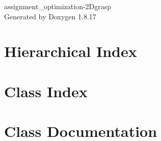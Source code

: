 \let\mypdfximage\pdfximage\def\pdfximage{\immediate\mypdfximage}\documentclass[twoside]{book}
\newcommand{\+}{\discretionary{\mbox{\scriptsize$\hookleftarrow$}}{}{}}
\newcommand{\clearemptydoublepage}{%
  \newpage{\pagestyle{empty}\cleardoublepage}%
}
\begin{document}
\hypersetup{pageanchor=false,
             bookmarksnumbered=true,
             pdfencoding=unicode
            }
\begin{titlepage}
\vspace*{7cm}
\begin{center}%
{\Large assignment\+\_\+optimization-\/2\+Dgrasp }\\
\vspace*{1cm}
{\large Generated by Doxygen 1.8.17}\\
\end{center}
\end{titlepage}
\clearemptydoublepage
{}
\tableofcontents
\clearemptydoublepage
{}
\hypersetup{pageanchor=true}

\chapter{Hierarchical Index}

\chapter{Class Index}

\chapter{Class Documentation}





\backmatter
\newpage
{}
\clearemptydoublepage
{}
\printindex
\end{document}
